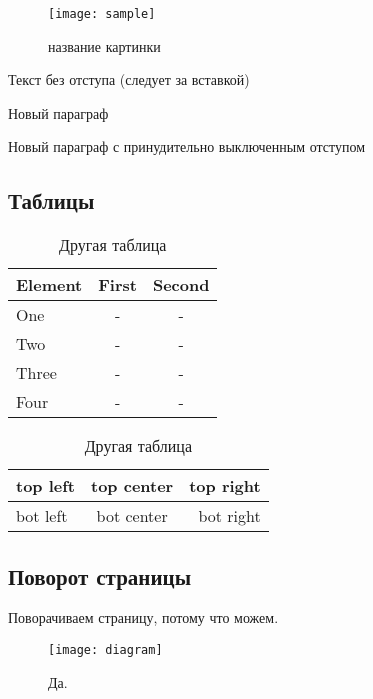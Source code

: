 \begin{figure}[H]
	\begin{center}
		\texttt{[image: sample]}
		\caption{название картинки}
		\label{pic:pic_name} %
	\end{center}
\end{figure}

Текст без отступа (следует за вставкой)

Новый параграф

\noindent Новый параграф с принудительно выключенным отступом


\subsection{Таблицы}

\begin{table}[H]
	\caption{Одна таблица}
	\begin{center}
		\begin{tabular*}{0.4\textwidth}{@{\extracolsep{\fill} } lcc}
			\toprule
			Element & First & Second \\
			\midrule
			One       & -    & -    \\
			Two       & -    & -    \\
			Three     & -    & -    \\
			Four      & -    & -    \\
			\bottomrule
		\end{tabular*}
		\label{tabular:tab_examp_1}
	\end{center}

	\caption{Другая таблица}
	\begin{center}
		\begin{tabular}{|l|c|r|}
			\hline
			top left & top center & top right \\ \hline
			bot left & bot center & bot right \\ \hline
		\end{tabular}
		\label{tabular:tab_examp_2}
	\end{center}
\end{table}

\begin{landscape}
	\subsection{Поворот страницы}
	Поворачиваем страницу, потому что можем.
	\begin{figure}[H]
		\centering
		\texttt{[image: diagram]}
		\caption{Да.}
	\end{figure}
\end{landscape}

